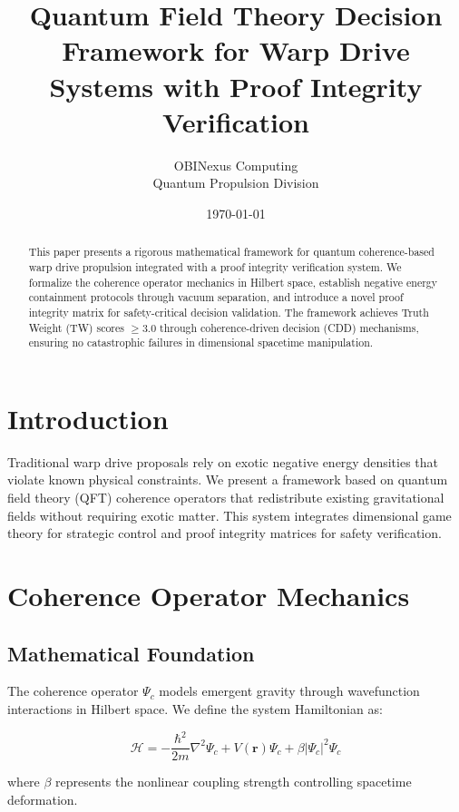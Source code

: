 \documentclass{article}
\title{Quantum Field Theory Decision Framework for Warp Drive Systems with Proof Integrity Verification}
\author{OBINexus Computing\\Quantum Propulsion Division}
\date{\today}
\begin{document}
\maketitle

\begin{abstract}
This paper presents a rigorous mathematical framework for quantum coherence-based warp drive propulsion integrated with a proof integrity verification system. We formalize the coherence operator mechanics in Hilbert space, establish negative energy containment protocols through vacuum separation, and introduce a novel proof integrity matrix for safety-critical decision validation. The framework achieves Truth Weight (TW) scores $\geq 3.0$ through coherence-driven decision (CDD) mechanisms, ensuring no catastrophic failures in dimensional spacetime manipulation.
\end{abstract}

\section{Introduction}

Traditional warp drive proposals rely on exotic negative energy densities that violate known physical constraints. We present a framework based on quantum field theory (QFT) coherence operators that redistribute existing gravitational fields without requiring exotic matter. This system integrates dimensional game theory for strategic control and proof integrity matrices for safety verification.

\section{Coherence Operator Mechanics}

\subsection{Mathematical Foundation}

The coherence operator $\Psi_c$ models emergent gravity through wavefunction interactions in Hilbert space. We define the system Hamiltonian as:

\begin{equation}
\mathcal{H} = -\frac{\hbar^2}{2m}\nabla^2\Psi_c + V(\mathbf{r})\Psi_c + \beta |\Psi_c|^2\Psi_c
\end{equation}

where $\beta$ represents the nonlinear coupling strength controlling spacetime deformation.
\end{document}
